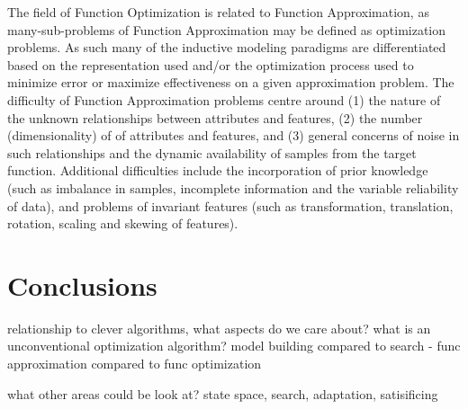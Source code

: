 \documentclass[a4paper, 11pt]{article}
\begin{document}
The field of Function Optimization is related to Function Approximation, as many-sub-problems of Function Approximation may be defined as optimization problems. As such many of the inductive modeling paradigms are differentiated based on the representation used and/or the optimization process used to minimize error or maximize effectiveness on a given approximation problem. 
The difficulty of Function Approximation problems centre around (1) the nature of the unknown relationships between attributes and features, (2) the number (dimensionality) of of attributes and features, and (3) general concerns of noise in such relationships and the dynamic availability of samples from the target function.
Additional difficulties include the incorporation of prior knowledge (such as imbalance in samples, incomplete information and the variable reliability of data), and problems of invariant features (such as transformation, translation, rotation, scaling and skewing of features).



% 
% 
\section{Conclusions}
\label{sec:conclusions}
relationship to clever algorithms, what aspects do we care about?
what is an unconventional optimization algorithm?
model building compared to search - func approximation compared to func optimization

what other areas could be look at?
state space, search, adaptation, satisificing





\end{document}
